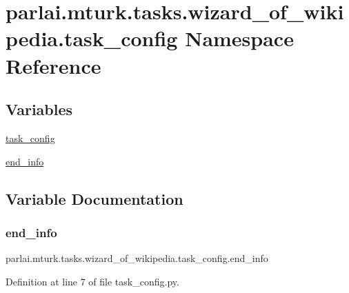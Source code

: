 \hypertarget{namespaceparlai_1_1mturk_1_1tasks_1_1wizard__of__wikipedia_1_1task__config}{}\section{parlai.\+mturk.\+tasks.\+wizard\+\_\+of\+\_\+wikipedia.\+task\+\_\+config Namespace Reference}
\label{namespaceparlai_1_1mturk_1_1tasks_1_1wizard__of__wikipedia_1_1task__config}
\subsection*{Variables}
\begin{DoxyCompactItemize}
\item 
\hyperlink{namespaceparlai_1_1mturk_1_1tasks_1_1wizard__of__wikipedia_1_1task__config_a3af76d193e83cdb4b21d97a348bd7c27}{task\+\_\+config}
\item 
\hyperlink{namespaceparlai_1_1mturk_1_1tasks_1_1wizard__of__wikipedia_1_1task__config_a38b6737e3c8a1013016d073b56ce9268}{end\+\_\+info}
\end{DoxyCompactItemize}


\subsection{Variable Documentation}
\mbox{\label{namespaceparlai_1_1mturk_1_1tasks_1_1wizard__of__wikipedia_1_1task__config_a38b6737e3c8a1013016d073b56ce9268}} 
\subsubsection{\texorpdfstring{end\+\_\+info}{end\_info}}
{\footnotesize\ttfamily parlai.\+mturk.\+tasks.\+wizard\+\_\+of\+\_\+wikipedia.\+task\+\_\+config.\+end\+\_\+info}



Definition at line 7 of file task\+\_\+config.\+py.

